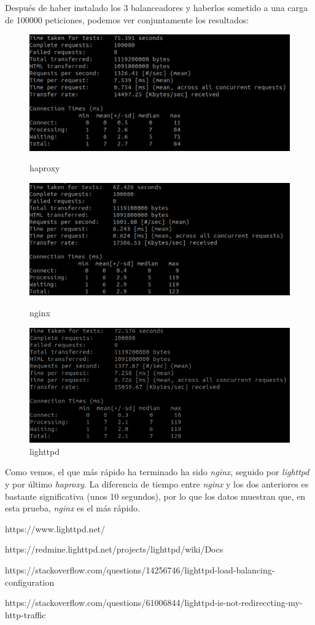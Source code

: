\documentclass[12pt]{article}
\begin{document}
Después de haber instalado los 3 balanceadores y haberlos sometido a una carga de 100000 peticiones, podemos ver conjuntamente los resultados:

\begin{figure}[H]
\center
\includegraphics[scale=0.4]{32.png}
\caption{haproxy}
\medskip
\includegraphics[scale=0.4]{33.png}
\caption{nginx}
\medskip
\includegraphics[scale=0.4]{34.png}
\caption{lighttpd}
\end{figure}

Como vemos, el que más rápido ha terminado ha sido \textit{nginx}, seguido por \textit{lighttpd} y por último \textit{haproxy}. La diferencia de tiempo entre \textit{nginx} y los dos anteriores es bastante significativa (unos 10 segundos), por lo que los datos muestran que, en esta prueba, \textit{nginx} es el más rápido.

\begin{thebibliography}{9}
https://www.lighttpd.net/

https://redmine.lighttpd.net/projects/lighttpd/wiki/Docs

https://stackoverflow.com/questions/14256746/lighttpd-load-balancing-configuration

https://stackoverflow.com/questions/61006844/lighttpd-is-not-redireccting-my-http-traffic

\end{thebibliography}
\end{document}
